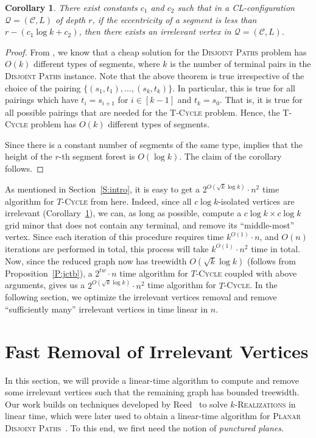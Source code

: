 \documentclass{article}
\newtheorem{corollary}[theorem]{Corollary}
\numberwithin{claimcounter}{lemma}
\newcommand{\tcycle}{$T$-\textsc{Cycle}\xspace}
\newcommand{\dispaths}{\textsc{Disjoint Paths}\xspace}
\begin{document}
\begin{corollary}\label{C:irrelevant}
  There exist constants $c_1$ and $c_2$ such that in a  CL-configuration $\mathcal{Q}=(\mathcal{C},L)$ of depth $r$, if the eccentricity of a segment is less than $r - (c_1 \log k + c_2)$, then there exists an irrelevant vertex in $\mathcal{Q}=(\mathcal{C},L)$.
\end{corollary}
\begin{proof}
    From \cite[Lemma 5]{JCTB},  we know that a cheap solution for the \dispaths problem has  $O(k)$ different types of segments, where $k$ is the number of terminal pairs in the \dispaths instance. Note that the above theorem is true irrespective of the choice of the pairing $\{ (s_1,t_1), \ldots,  (s_k,t_k)\}$. In particular, this is true for all pairings which have $t_{i} = s_{i+1}$ for $i\in [k-1]$ and $t_k = s_0$. That is, it is true for all possible pairings that are needed for the \textsc{T-Cycle} problem. Hence, the \textsc{T-Cycle} problem has  $O(k)$ different types of segments.
    
    Since there is a constant number of segments of the same type,  implies  that the height of the $r$-th segment forest is $O(\log k)$. The claim of the corollary follows.
\end{proof}

As mentioned in Section~\ref{S:intro}, it is easy to get a $2^{O(\sqrt{k}\log k)}\cdot n^2$ time algorithm for \tcycle from here. Indeed,  since all $c\log k$-isolated vertices are irrelevant (Corollary~\ref{C:irrelevant}), we can, as long as possible, compute a $c\log k\times c\log k$ grid minor that does not contain any terminal, and remove its ``middle-most'' vertex. Since each iteration of this procedure requires time $k^{O(1)}\cdot n$, and $O(n)$ iterations are performed in total, this process will take  $k^{O(1)}\cdot n^2$ time in total. Now, since the reduced graph now has treewidth  $O(\sqrt{k}\log k)$ (follows from Proposition~\ref{P:jctb}), a $2^{tw}\cdot n$ time algorithm for \tcycle coupled with above arguments, gives us a $2^{O(\sqrt{k}\log k)}\cdot n^2$ time algorithm for \tcycle. In the following section, we optimize the irrelevant vertices removal and remove ``sufficiently many'' irrelevant vertices in time linear in $n$.

\section{Fast Removal of Irrelevant Vertices} \label{sec:reeddeco}
In this section, we will provide a linear-time algorithm to compute and remove some irrelevant vertices such that the remaining graph has bounded treewidth. Our work builds on techniques developed by Reed~\cite{reedLinear} to solve $k$-\textsc{Realizations} in linear time, which were later used to obtain a linear-time algorithm for \textsc{Planar Disjoint Paths}~\cite{cho2023parameterized}. To this end, we first need the notion of \textit{punctured planes}.
\end{document}
